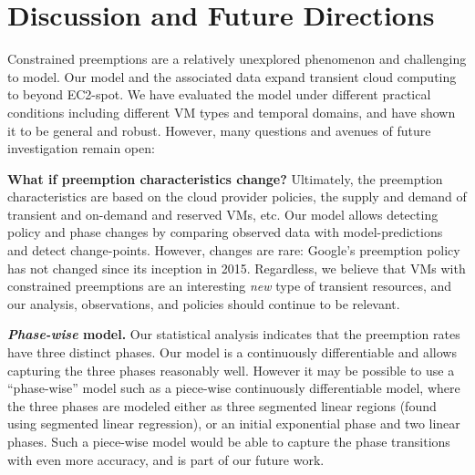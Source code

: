 \section{Discussion and Future Directions}
\label{sec:discussion}


Constrained preemptions are a relatively unexplored phenomenon and challenging to model.
Our model and the associated data expand transient cloud computing to beyond EC2-spot.
We have evaluated the model under different practical conditions including different VM types and temporal domains, and have shown it to be general and robust. 
However, many questions and avenues of future investigation remain open:

\noindent \textbf{What if preemption characteristics change?}
Ultimately, the preemption characteristics are based on the cloud provider policies, the supply and demand of transient and on-demand and reserved VMs, etc. 
Our model allows detecting policy and phase changes by comparing observed data with model-predictions and detect change-points.
However, changes are rare: Google's preemption policy has not changed since its inception in 2015. 
Regardless, we believe that VMs with constrained preemptions are an interesting \emph{new} type of transient resources, and our analysis, observations, and policies should continue to be relevant. 


\noindent \textbf{\emph{Phase-wise} model.}
Our statistical analysis indicates that the preemption rates have three distinct phases. 
Our model is a continuously differentiable and allows capturing the three phases reasonably well. 
However it may be possible to use a ``phase-wise'' model such as a piece-wise continuously differentiable model, where the three phases are modeled either as three segmented linear regions (found using segmented linear regression), or an initial exponential phase and two linear phases. 
Such a piece-wise model would be able to capture the phase transitions with even more accuracy, and is part of our future work. 

